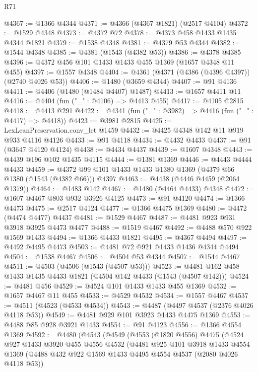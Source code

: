 \begin{lexlean}{R71}
\begin{coremodule}
@4367 := @1366 @4344
@4371 := @4366 (@4367 @1821) (@2517 @4104)
@4372 := @1529 @4348
@4373 := @4372 @72
@4378 := @4373 @458 @1433 @1435 @4344 @1821
@4379 := @1538 @4348
@4381 := @4379 @53 @4344
@4382 := @1544 @4348
@4385 := @4381 (@1543 (@4382 @53))
@4386 := @4378 @4385
@4396 := @4372 @456 @101 @1433 @1433 @455 @1369 (@1657 @4348 @11 @455)
@4397 := @1557 @4348
@4404 := @4361 (@4371 (@4386 (@4396 @4397)) (@2740 @4026 @53))
@4406 := @1480 (@3659 @4344)
@4407 := @91 @4136
@4411 := @4406 (@1480 (@1484 @4407) @1487)
@4413 := @1657 @4411 @11
@4416 := @4404 (fun ("_" : @4106) => @4413 @455)
@4417 := @4105 @2815
@4418 := @4413 @291
@4422 := @4341 (fun ("_" : @3982) => @4416 (fun ("_" : @4417) => @4418))
@4423 := @3981 @2815
@4425 := LexLeanPreservation.conv_let @1459
@4432 := @4425 @4348 @142 @11 @919 @933 @4116 @4126
@4433 := @91 @4118
@4434 := @4432 @4433
@4437 := @91 (@3647 @4120 @4124)
@4438 := @4434 @4437
@4439 := @1607 @4348
@4443 := @4439 @196 @102 @1435 @4115
@4444 := @1381 @1369
@4446 := @4443 @4444 @4433
@4459 := @4372 @99 @101 @1433 @1433 @1380 @1369 (@4379 @66 @1380 (@1543 (@4382 @66))) @4397
@4463 := @4438 (@4446 @4459 (@2064 @1379))
@4464 := @1483 @142
@4467 := @1480 (@4464 @4433) @4348
@4472 := @1607 @4467 @803 @932 @3926 @4125
@4473 := @91 @4120
@4474 := @1366 @4473
@4475 := @2517 @4124
@4477 := @1366 @4475 @1369
@4480 := @4472 (@4474 @4477) @4437
@4481 := @1529 @4467
@4487 := @4481 @923 @931 @3918 @3925 @4473 @4477
@4488 := @1519 @4467
@4492 := @4488 @570 @922 @1569 @1433
@4494 := @1366 @4433 @1821
@4495 := @4367 @4494
@4497 := @4492 @4495 @4473
@4503 := @4481 @72 @921 @1433 @1436 @4344 @4494
@4504 := @1538 @4467
@4506 := @4504 @53 @4344
@4507 := @1544 @4467
@4511 := @4503 (@4506 (@1543 (@4507 @53)))
@4523 := @4481 @162 @458 @1433 @1435 @4433 @1821 (@4504 @142 @4433 (@1543 (@4507 @142)))
@4524 := @4481 @456
@4529 := @4524 @101 @1433 @1433 @455 @1369
@4532 := @1657 @4467 @11 @455
@4533 := @4529 @4532
@4534 := @1557 @4467
@4537 := @4511 (@4523 (@4533 @4534))
@4543 := @4487 (@4497 @4537 (@2376 @4026 @4118 @53))
@4549 := @4481 @929 @101 @3923 @1433 @4475 @1369
@4553 := @4488 @85 @928 @3921 @1433
@4554 := @91 @4123
@4556 := @1366 @4554 @1369
@4592 := @4480
    (@4543
      (@4549
        (@4553
          (@1820 @4556)
          @4475
          (@4524
            @927
            @1433
            @3920
            @455
            @4556
            @4532
            (@4481
              @925
              @101
              @3918
              @1433
              @4554
              @1369
              (@4488 @432 @922 @1569 @1433 @4495 @4554 @4537 (@2080 @4026 @4118 @53))

\end{coremodule}
\end{lexlean}
